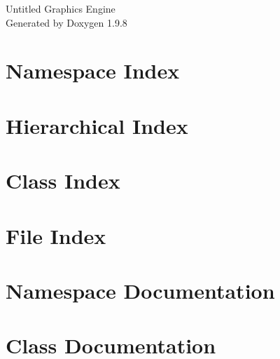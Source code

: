 \documentclass[twoside]{book}
\newcommand{\+}{\discretionary{\mbox{\scriptsize$\hookleftarrow$}}{}{}}
\newcommand{\clearemptydoublepage}{%
    \newpage{\pagestyle{empty}\cleardoublepage}%
  }
\begin{document}
  \raggedbottom
    \hypersetup{pageanchor=false,
                bookmarksnumbered=true,
                pdfencoding=unicode
               }
  \begin{titlepage}
  \vspace*{7cm}
  \begin{center}%
  {\Large Untitled Graphics Engine}\\
  \vspace*{1cm}
  {\large Generated by Doxygen 1.9.8}\\
  \end{center}
  \end{titlepage}
  \clearemptydoublepage
  \tableofcontents
  \clearemptydoublepage
  \hypersetup{pageanchor=true}
\chapter{Namespace Index}

\chapter{Hierarchical Index}

\chapter{Class Index}

\chapter{File Index}

\chapter{Namespace Documentation}


\chapter{Class Documentation}





























\end{document}
